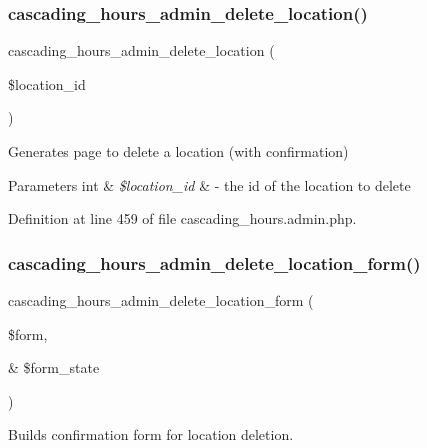 \subsubsection{\texorpdfstring{cascading\+\_\+hours\+\_\+admin\+\_\+delete\+\_\+location()}{cascading\_hours\_admin\_delete\_location()}}
{\footnotesize\ttfamily cascading\+\_\+hours\+\_\+admin\+\_\+delete\+\_\+location (\begin{DoxyParamCaption}\item[{}]{\$location\+\_\+id }\end{DoxyParamCaption})}



Generates page to delete a location (with confirmation) 


\begin{DoxyParams}[1]{Parameters}
int & {\em \$location\+\_\+id} & -\/ the id of the location to delete \\
\hline
\end{DoxyParams}


Definition at line 459 of file cascading\+\_\+hours.\+admin.\+php.

\mbox{\label{cascading__hours_8admin_8php_a0c55391c2ef3dedd13b15f979d3340ad_a0c55391c2ef3dedd13b15f979d3340ad}} 
\subsubsection{\texorpdfstring{cascading\+\_\+hours\+\_\+admin\+\_\+delete\+\_\+location\+\_\+form()}{cascading\_hours\_admin\_delete\_location\_form()}}
{\footnotesize\ttfamily cascading\+\_\+hours\+\_\+admin\+\_\+delete\+\_\+location\+\_\+form (\begin{DoxyParamCaption}\item[{}]{\$form,  }\item[{\&}]{\$form\+\_\+state }\end{DoxyParamCaption})}



Builds confirmation form for location deletion. 


